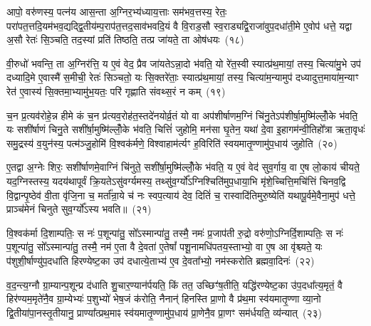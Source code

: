 {\anuvakamend[{यु॒ञ्जा॒नेष्वग्ने᳚ प्रा॒चीन॑मुत्ता॒नं वा॑म॒भृत॒ञ्चतु॑र्विꣳशतिश्च}]}%

आपो॒ वरु॑णस्य॒ पत्न॑य आस॒न्ता अ॒ग्निर॒भ्य॑ध्याय॒त्ताः सम॑भव॒त्तस्य॒ रेतः॒ परा॑पत॒त्तदि॒यम॑भव॒द्यद्द्वि॒तीय॑म्प॒राप॑त॒त्तद॒सा\-व॑भवदि॒यं वै वि॒राड॒सौ स्व॒राड्यद्वि॒राजा॑वुप॒दधा॑ती॒मे ए॒वोप॑ धत्ते॒ यद्वा अ॒सौ रेतः॑ सि॒ञ्चति॒ तद॒स्यां प्रति॑ तिष्ठति॒ तत्प्र जा॑यते॒ ता ओष॑धयः~(१८)

वी॒रुधो॑ भवन्ति॒ ता अ॒ग्निर॑त्ति॒ य ए॒वं वेद॒ प्रैव जा॑यते\-ऽन्ना॒दो भ॑वति॒ यो रे॑त॒स्वी स्यात्प्र॑थ॒मायां॒ तस्य॒ चित्या॑मु॒भे उप॑ दध्यादि॒मे ए॒वास्मै॑ स॒मीची॒ रेतः॑ सिञ्चतो॒ यः सि॒क्तरे॑ताः॒ स्यात्प्र॑थ॒मायां॒ तस्य॒ चित्या॑म॒न्यामुप॑ दध्यादुत्त॒माया॑\-म॒न्याꣳ रेत॑ ए॒वास्य॑ सि॒क्तमा॒भ्यामु॑भ॒यतः॒ परि॑ गृह्णाति संवथ्स॒रं न कम्~(१९)

च॒न प्र॒त्यव॑रोहे॒न्न हीमे कं च॒न प्र॑त्यव॒रोह॑त॒स्तदे॑नयोर्व्र॒तं यो वा अप॑शीर्\mbox{}षाणम॒ग्निं चि॑नु॒ते\-ऽप॑शीर्\mbox{}षा॒मुष्मि॑ल्लोँ॒के भ॑वति॒ यः सशी॑र्\mbox{}षाणं चिनु॒ते सशी॑र्\mbox{}षा॒मुष्मि॑ल्लोँ॒के भ॑वति॒ चित्तिं॑ जुहोमि॒ मन॑सा घृ॒तेन॒ यथा॑ दे॒वा इ॒हागम॑न्वी॒तिहो᳚त्रा ऋता॒वृधः॑ समु॒द्रस्य॑ व॒युन॑स्य॒ पत्म॑ञ्जु॒होमि॑ वि॒श्वक॑र्मणे॒ विश्वाहाम॑र्त्यꣳ ह॒विरिति॑ स्वयमातृ॒ण्णामु॑प॒धाय॑ जुहोति~(२०)

ए॒तद्वा अ॒ग्नेः शिरः॒ सशी॑र्\mbox{}षाणमे॒वाग्निं चि॑नुते॒ सशी॑र्\mbox{}षा॒मुष्मि॑ल्लोँ॒के भ॑वति॒ य ए॒वं वेद॑ सुव॒र्गाय॒ वा ए॒ष लो॒काय॑ चीयते॒ यद॒ग्निस्तस्य॒ यदय॑थापूर्वं क्रि॒यते\-ऽसु॑वर्ग्यमस्य॒ तथ्सु॑व॒र्ग्यो᳚\-ऽग्निश्चिति॑मुप॒धाया॒भि मृ॑शे॒च्चित्ति॒मचि॑त्तिं चिनव॒द्वि वि॒द्वान्पृ॒ष्ठेव॑ वी॒ता वृ॑जि॒ना च॒ मर्ता᳚न्रा॒ये च॑ नः स्वप॒त्याय॑ देव॒ दितिं॑ च॒ रास्वादि॑तिमुरु॒ष्येति॑ यथापू॒र्वमे॒वैना॒मुप॑ धत्ते॒ प्राञ्च॑मेनं चिनुते सुव॒र्ग्यो᳚\-ऽस्य भवति॥~(२१)

{\anuvakamend[{ओष॑धयः॒ कञ्जु॑होति स्वप॒त्याया॒ष्टाद॑श च}]}%

वि॒श्वक॑र्मा दि॒शाम्पतिः॒ स नः॑ प॒शून्पा॑तु॒ सो᳚\-ऽस्मान्पा॑तु॒ तस्मै॒ नमः॑ प्र॒जाप॑ती रु॒द्रो वरु॑णो॒\-ऽग्निर्दि॒शाम्पतिः॒ स नः॑ प॒शून्पा॑तु॒ सो᳚\-ऽस्मान्पा॑तु॒ तस्मै॒ नम॑ ए॒ता वै दे॒वता॑ ए॒तेषां᳚ पशू॒नामधि॑पतय॒स्ताभ्यो॒ वा ए॒ष आ वृ॑श्च्यते॒ यः प॑शुशी॒र्\mbox{}षाण्यु॑प॒दधा॑ति हिरण्येष्ट॒का उप॑ दधात्ये॒ताभ्य॑ ए॒व दे॒वता᳚भ्यो॒ नम॑स्करोति ब्रह्मवा॒दिनः॑~(२२)

व॒द॒न्त्य॒ग्नौ ग्रा॒म्यान्प॒शून्प्र द॑धाति शु॒चार॒ण्यान॑र्पयति॒ किं तत॒ उच्छिꣳ॑ष॒तीति॒ यद्धि॑रण्येष्ट॒का उ॑प॒दधा᳚त्य॒मृतं॒ वै हिर॑ण्यम॒मृते॑नै॒व ग्रा॒म्येभ्यः॑ प॒शुभ्यो॑ भेष॒जं क॑रोति॒ नैनान्॑ हिनस्ति प्रा॒णो वै प्र॑थ॒मा स्व॑यमातृ॒ण्णा व्या॒नो द्वि॒तीया॑पा॒नस्तृ॒तीयानु॒ प्राण्या᳚त्प्रथ॒माꣴ स्व॑यमातृ॒ण्णामु॑प॒धाय॑ प्रा॒णेनै॒व प्रा॒णꣳ सम॑र्धयति॒ व्य॑न्यात्~(२३)

